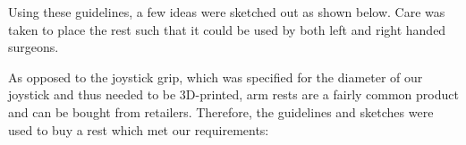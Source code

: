 Using these guidelines, a few ideas were sketched out as shown below. Care was taken to place the rest such that it could be used by both left and right handed surgeons.

As opposed to the joystick grip, which was specified for the diameter of our joystick and thus needed to be 3D-printed, arm rests are a fairly common product and can be bought from retailers. Therefore, the guidelines and sketches were used to buy a rest which met our requirements:


